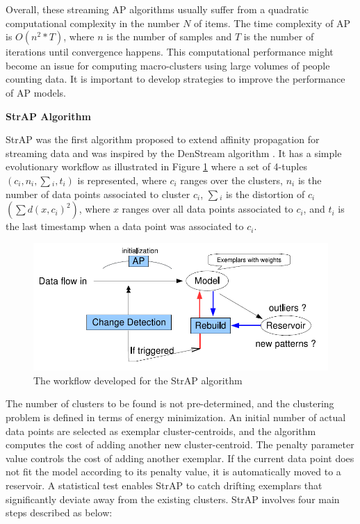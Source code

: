 
Overall, these streaming AP algorithms usually suffer from a quadratic computational complexity in the number $N$ of items. The time complexity of AP is $O(n^2*T)$, where $n$ is the number of samples and $T$ is the number of iterations until convergence happens\cite{refianti2017time}. This computational performance might become an issue for computing macro-clusters using large volumes of people counting data. It is important to develop strategies to improve the performance of AP models.


\textbf{StrAP Algorithm}

StrAP was the first algorithm proposed to extend affinity propagation for streaming data and was inspired by the DenStream algorithm \cite{zhang2008data}. It has a simple evolutionary workflow as illustrated in Figure \ref{stmodl} where a set of 4-tuples $(c_i,n_i,\sum{_i},t{_i})$ is represented, where  $c_i$ ranges over the clusters, $n_i$ is the number of data points associated to cluster $c_i$, $\sum{_i}$ is the distortion of $c_i$ $(\sum{d(x,c_i)^2})$, where $x$ ranges over all data points associated to $c_i$, and $t_i$ is the last timestamp when a data point was associated to $c_i$.


\begin{figure}[!ht]
\centering
\includegraphics[width = 13 cm]{image/Chapters/Chapter3/strapmodel.PNG}
\caption{The workflow developed for the StrAP algorithm }
\label{stmodl}
\end{figure}


The number of clusters to be found is not pre-determined, and the clustering problem is defined in terms of energy minimization. An initial number of actual data points are selected as exemplar cluster-centroids, and the algorithm computes the cost of adding another new cluster-centroid. The penalty parameter value controls the cost of adding another exemplar. If the current data point does not fit the model according to its penalty value, it is automatically moved to a reservoir. A statistical test enables StrAP to catch drifting exemplars that significantly deviate away from the existing clusters. StrAP involves four main steps described as below:  

